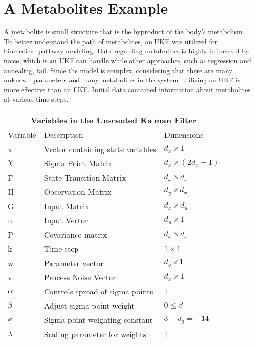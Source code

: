 \section{A Metabolites Example}
\label{A Metabolites Example}

A metabolite is small structure that is the byproduct of the body's metabolism. To better understand the path of metabolites, an UKF was utilized for biomedical pathway modeling. Data regarding metabolites is highly influenced by noise, which is an UKF can handle while other approaches, such as regression and annealing, fail. Since the model is complex, considering that there are many unknown parameters and many metabolites in the system, utilizing an UKF is more effective than an EKF. Initial data contained information about metabolites at various time steps.
\begin{center}
    
\centering
\begin{tabular}{ |p{2cm}||p{5cm}|p{3cm}| }
    \hline
    \multicolumn{3}{|c|}{Variables in the Unscented Kalman Filter } \\ 
    \hline
    Variable & Description & Dimensions \\
    \hline
    x & Vector containing state variables & $d_x \times 1 $\\ 
    $\chi $& Sigma Point Matrix &$ d_x \times (2 d_x + 1) $\\
    F & State Transition Matrix  & $d_x \times d_x $  \\ 
    H & Observation Matrix & $d_y \times d_x$\\
    G & Input Matrix & $d_x \times d_u$\\
    u & Input Vector  & $d_u \times 1$\\
    P & Covariance matrix & $d_x \times d_x $  \\
    k & Time step  & $1 \times 1$\\
    w & Parameter vector & $d_q \times 1$\\
    v & Process Noise Vector & $d_x \times 1$\\
    $\alpha$ & Controls spread of sigma points & 1 \\
    $\beta$ & Adjust sigma point weight & $0 \leq  \beta$ \\
    $\kappa $ & Sigma point weighting constant & $3 - d_q = -14 $ \\
    $\lambda $ & Scaling parameter for weights & 1 \\
    \hline
\end{tabular}
\end{center}

